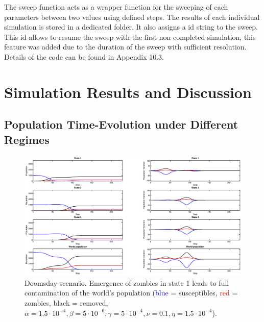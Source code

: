 \documentclass[11pt]{article} %
\begin{document}
The sweep function acts as a wrapper function for the sweeping of each parameters between two values using defined steps. The results of each individual simulation is stored in a dedicated folder. It also assigns a id string to the sweep. This id allows to resume the sweep with the first non completed simulation, this feature was added due to the duration of the sweep with sufficient resolution. Details of the code can be found in Appendix 10.3.
\newpage
\section{Simulation Results and Discussion}\indent

\subsection{Population Time-Evolution under Different Regimes}\indent
 
\begin{figure}[h!]
\centerline{
\includegraphics[scale=0.35]{Images/example_doomsday.eps}}
\caption{Doomsday scenario. Emergence of zombies in state 1 leads to full contamination of the world's population (\textcolor{blue}{blue} = susceptibles, \textcolor{red}{red} = zombies, black = removed, $\alpha=1.5\cdot10^{-4}, \beta=5\cdot10^{-6}, \gamma=5\cdot10^{-4}, \nu=0.1, \eta=1.5\cdot10^{-4}$). \label{doomsday} }
\end{figure}
\end{document}
